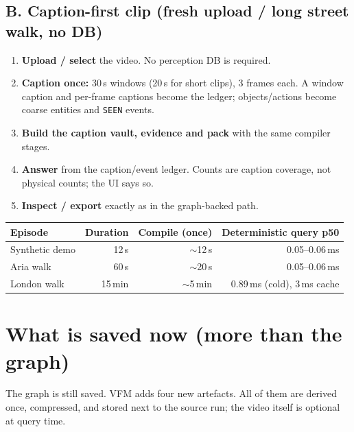 \documentclass[10pt,a4paper]{article}
\newcommand{\code}[1]{\texttt{\small #1}}
\begin{document}
\subsection*{B. Caption-first clip (fresh upload / long street walk, no DB)}

\begin{enumerate}[leftmargin=1.35em,itemsep=1pt]
  \item \textbf{Upload / select} the video. No perception DB is required.
  \item \textbf{Caption once:} 30\,s windows (20\,s for short clips), 3 frames each. A window caption and per-frame captions become the ledger; objects/actions become coarse entities and \code{SEEN} events.
  \item \textbf{Build the caption vault, evidence and pack} with the same compiler stages.
  \item \textbf{Answer} from the caption/event ledger. Counts are caption coverage, not physical counts; the UI says so.
  \item \textbf{Inspect / export} exactly as in the graph-backed path.
\end{enumerate}

\begin{center}
\small
\begin{tabularx}{\linewidth}{@{}l r r r@{}}
\toprule
Episode & Duration & Compile (once) & Deterministic query p50 \\
\midrule
Synthetic demo & 12\,s & $\sim$12\,s & 0.05--0.06\,ms \\
Aria walk & 60\,s & $\sim$20\,s & 0.05--0.06\,ms \\
London walk & 15\,min & $\sim$5\,min & 0.89\,ms (cold), 3\,ms cache \\
\bottomrule
\end{tabularx}
\end{center}

\section{What is saved now (more than the graph)}

The graph is still saved. VFM adds four new artefacts. All of them are derived once, compressed,
and stored next to the source run; the video itself is optional at query time.
\end{document}
